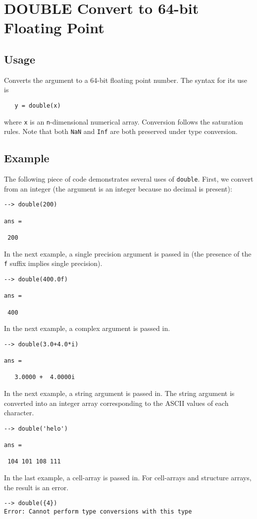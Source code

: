 \section{DOUBLE Convert to 64-bit Floating Point}

\subsection{Usage}

Converts the argument to a 64-bit floating point number.  The syntax
for its use is
\begin{verbatim}
   y = double(x)
\end{verbatim}
where \verb|x| is an \verb|n|-dimensional numerical array.  Conversion follows the 
saturation rules.  Note that both \verb|NaN| and \verb|Inf| are both preserved under type conversion.
\subsection{Example}

The following piece of code demonstrates several uses of \verb|double|.  First, 
we convert from an integer (the argument is an integer because no decimal is present):
\begin{verbatim}
--> double(200)

ans = 

 200 
\end{verbatim}
In the next example, a single precision argument is passed in (the presence of 
the \verb|f| suffix implies single precision).
\begin{verbatim}
--> double(400.0f)

ans = 

 400 
\end{verbatim}
In the next example, a complex argument is passed in.
\begin{verbatim}
--> double(3.0+4.0*i)

ans = 

   3.0000 +  4.0000i 
\end{verbatim}
In the next example, a string argument is passed in.  The string argument 
is converted into an integer array corresponding to the ASCII values of each character.
\begin{verbatim}
--> double('helo')

ans = 

 104 101 108 111 
\end{verbatim}
In the last example, a cell-array is passed in.  For cell-arrays 
and structure arrays, the result is an error.
\begin{verbatim}
--> double({4})
Error: Cannot perform type conversions with this type
\end{verbatim}
